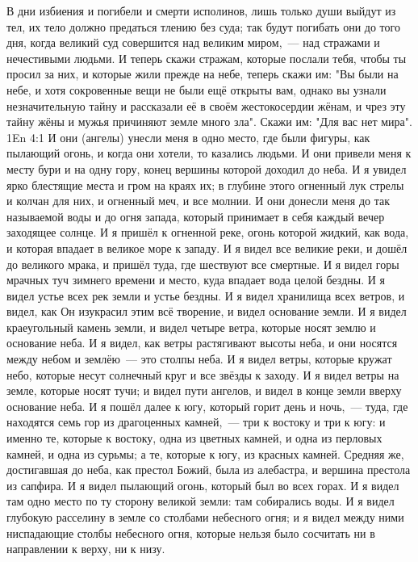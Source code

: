 В дни избиения и погибели и смерти исполинов, лишь только души
выйдут из тел, их тело должно предаться тлению без суда; так будут погибать
они до того дня, когда великий суд совершится над великим миром,~--- над стражами
и нечестивыми людьми.
И теперь скажи стражам, которые послали тебя, чтобы ты просил за них,
и которые жили прежде на небе, теперь скажи им: "Вы были на небе, и хотя
сокровенные вещи не были ещё открыты вам, однако вы узнали незначительную тайну
и рассказали её в своём жестокосердии жёнам, и чрез эту тайну жёны и мужья
причиняют земле много зла".
Скажи им: "Для вас нет мира".
\vs 1En 4:1
И они (ангелы) унесли меня в одно место, где были фигуры, как
пылающий огонь, и когда они хотели, то казались людьми.
И они привели меня к месту бури и на одну гору, конец вершины которой
доходил до неба.
И я увидел ярко блестящие места и гром на краях их; в глубине этого
огненный лук стрелы и колчан для них, и огненный меч, и все молнии.
И они донесли меня до так называемой воды и до огня запада, который
принимает в себя каждый вечер заходящее солнце.
И я пришёл к огненной реке, огонь которой жидкий, как вода, и которая
впадает в великое море к западу.
И я видел все великие реки, и дошёл до великого мрака, и пришёл туда,
где шествуют все смертные.
И  я  видел горы мрачных туч зимнего времени и место, куда впадает
вода целой бездны.
И я видел устье всех рек земли и устье бездны.
И я видел хранилища всех ветров, и видел, как Он изукрасил этим
всё творение, и видел основание земли.
И я видел краеугольный камень земли, и видел четыре ветра, которые
носят землю и основание неба.
И я видел, как ветры растягивают высоты неба, и они носятся между
небом и землёю~--- это столпы неба.
И я видел ветры, которые кружат небо, которые несут солнечный круг и
все звёзды к заходу.
И я видел ветры на земле, которые носят тучи; и видел пути ангелов,
и видел в конце земли вверху основание неба.
И я пошёл далее к югу, который горит день и ночь,~--- туда, где
находятся семь гор из драгоценных камней,~--- три к востоку и три к югу: и
именно те, которые к востоку, одна из цветных камней, и одна из перловых
камней, и одна из сурьмы; а те, которые к югу, из красных камней.
Средняя же, достигавшая до неба, как престол Божий, была из
алебастра, и вершина престола из сапфира.
И я видел пылающий огонь, который был во всех горах.
И я видел там одно место по ту сторону великой земли: там собирались
воды.
И я видел глубокую расселину в земле со столбами небесного огня; и я
видел между ними ниспадающие столбы небесного огня, которые нельзя было
сосчитать ни в направлении к верху, ни к низу.
